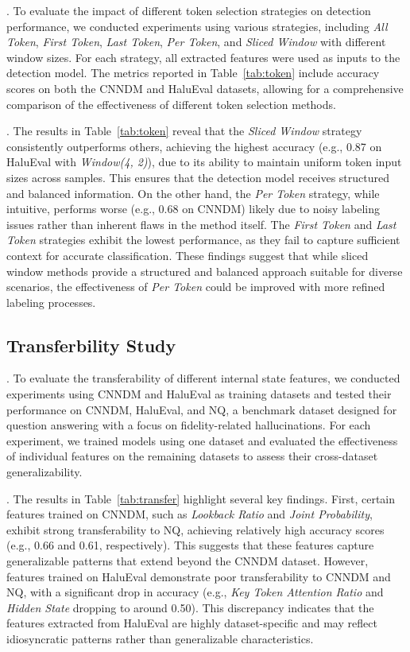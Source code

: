 . To evaluate the impact of different token selection strategies on detection performance, we conducted experiments using various strategies, including \textit{All Token}, \textit{First Token}, \textit{Last Token}, \textit{Per Token}, and \textit{Sliced Window} with different window sizes. For each strategy, all extracted features were used as inputs to the detection model. The metrics reported in Table~\ref{tab:token} include accuracy scores on both the CNNDM and HaluEval datasets, allowing for a comprehensive comparison of the effectiveness of different token selection methods.

.
The results in Table~\ref{tab:token} reveal that the \textit{Sliced Window} strategy consistently outperforms others, achieving the highest accuracy (e.g., 0.87 on HaluEval with \textit{Window(4, 2)}), due to its ability to maintain uniform token input sizes across samples. This ensures that the detection model receives structured and balanced information. On the other hand, the \textit{Per Token} strategy, while intuitive, performs worse (e.g., 0.68 on CNNDM) likely due to noisy labeling issues rather than inherent flaws in the method itself. The \textit{First Token} and \textit{Last Token} strategies exhibit the lowest performance, as they fail to capture sufficient context for accurate classification. These findings suggest that while sliced window methods provide a structured and balanced approach suitable for diverse scenarios, the effectiveness of \textit{Per Token} could be improved with more refined labeling processes.

\subsection{Transferbility Study}\label{sec:detect:transfer}

.
To evaluate the transferability of different internal state features, we conducted experiments using CNNDM and HaluEval as training datasets and tested their performance on CNNDM, HaluEval, and NQ, a benchmark dataset designed for question answering with a focus on fidelity-related hallucinations. For each experiment, we trained models using one dataset and evaluated the effectiveness of individual features on the remaining datasets to assess their cross-dataset generalizability.

.
The results in Table~\ref{tab:transfer} highlight several key findings. First, certain features trained on CNNDM, such as \textit{Lookback Ratio} and \textit{Joint Probability}, exhibit strong transferability to NQ, achieving relatively high accuracy scores (e.g., 0.66 and 0.61, respectively). This suggests that these features capture generalizable patterns that extend beyond the CNNDM dataset. However, features trained on HaluEval demonstrate poor transferability to CNNDM and NQ, with a significant drop in accuracy (e.g., \textit{Key Token Attention Ratio} and \textit{Hidden State} dropping to around 0.50). This discrepancy indicates that the features extracted from HaluEval are highly dataset-specific and may reflect idiosyncratic patterns rather than generalizable characteristics.


